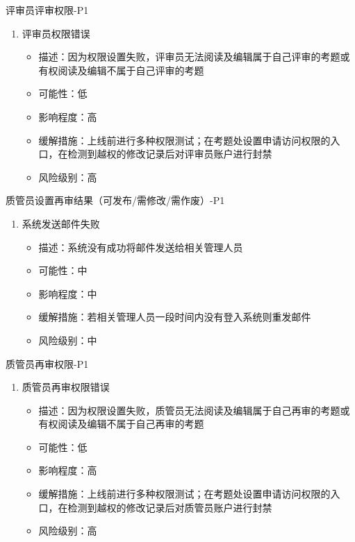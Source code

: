 \documentclass[hyperref, a4paper]{ctexart}
\providecommand{\tightlist}{%
  \setlength{\itemsep}{0pt}\setlength{\parskip}{0pt}}
\begin{document}
评审员评审权限-P1

\begin{enumerate}
\def\labelenumi{\arabic{enumi}.}
\tightlist
\item
  评审员权限错误

  \begin{itemize}
  \tightlist
  \item
    描述：因为权限设置失败，评审员无法阅读及编辑属于自己评审的考题或有权阅读及编辑不属于自己评审的考题
  \item
    可能性：低
  \item
    影响程度：高
  \item
    缓解措施：上线前进行多种权限测试；在考题处设置申请访问权限的入口，在检测到越权的修改记录后对评审员账户进行封禁
  \item
    风险级别：高
  \end{itemize}
\end{enumerate}

质管员设置再审结果（可发布/需修改/需作废）-P1

\begin{enumerate}
\def\labelenumi{\arabic{enumi}.}
\tightlist
\item
  系统发送邮件失败

  \begin{itemize}
  \tightlist
  \item
    描述：系统没有成功将邮件发送给相关管理人员
  \item
    可能性：中
  \item
    影响程度：中
  \item
    缓解措施：若相关管理人员一段时间内没有登入系统则重发邮件
  \item
    风险级别：中
  \end{itemize}
\end{enumerate}

质管员再审权限-P1

\begin{enumerate}
\def\labelenumi{\arabic{enumi}.}
\tightlist
\item
  质管员再审权限错误

  \begin{itemize}
  \tightlist
  \item
    描述：因为权限设置失败，质管员无法阅读及编辑属于自己再审的考题或有权阅读及编辑不属于自己再审的考题
  \item
    可能性：低
  \item
    影响程度：高
  \item
    缓解措施：上线前进行多种权限测试；在考题处设置申请访问权限的入口，在检测到越权的修改记录后对质管员账户进行封禁
  \item
    风险级别：高
  \end{itemize}
\end{enumerate}
\end{document}
